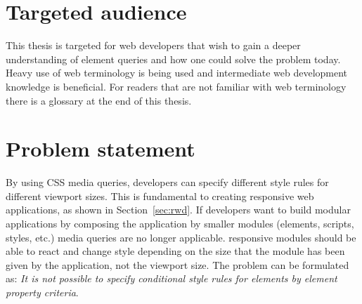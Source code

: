 \documentclass[a4paper,11pt]{kth-mag}
\newcommand{\problemformulation}{\emph{It is not possible to specify conditional style rules for \glspl{element} by element property criteria}}
\begin{document}
    \section{Targeted audience}
      This thesis is targeted for \gls{web} developers that wish to gain a deeper understanding of element queries and how one could solve the problem today.
      Heavy use of \gls{web} terminology is being used and intermediate \gls{web} development knowledge is beneficial.
      For readers that are not familiar with \gls{web} terminology there is a glossary at the end of this thesis.
    \section{Problem statement}\label{sec:problem}
      By using \gls{CSS} \gls{media queries}, developers can specify different style rules for different \gls{viewport} sizes.
      This is fundamental to creating \gls{responsive} \gls{web} applications, as shown in Section~\ref{sec:rwd}.
      If developers want to build modular applications by composing the application by smaller modules (\glspl{element}, scripts, styles, etc.) \gls{media queries} are no longer applicable.
      \Gls{responsive} modules should be able to react and change style depending on the size that the module has been given by the application, not the \gls{viewport} size. 
      The problem can be formulated as: \problemformulation.
\end{document}
